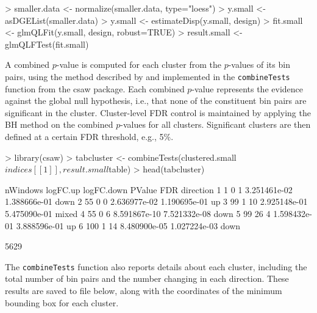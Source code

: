 \documentclass[12pt]{report}
\renewenvironment{Schunk}{\vspace{0pt}}{\vspace{0pt}}
\newcommand{\csaw}{csaw}
\newcommand{\code}[1]{{\small\texttt{#1}}}
\begin{document}
\begin{Schunk}
\begin{Sinput}
> smaller.data <- normalize(smaller.data, type="loess")
> y.small <- asDGEList(smaller.data)
> y.small <- estimateDisp(y.small, design)
> fit.small <- glmQLFit(y.small, design, robust=TRUE)
> result.small <- glmQLFTest(fit.small)
\end{Sinput}
\end{Schunk}

A combined $p$-value is computed for each cluster from the $p$-values of its bin pairs, using the method described by \cite{simes1986} and implemented in the \code{combineTests} function from the \csaw{} package.
Each combined $p$-value represents the evidence against the global null hypothesis, i.e., that none of the constituent bin pairs are significant in the cluster.
Cluster-level FDR control is maintained by applying the BH method on the combined $p$-values for all clusters.
Significant clusters are then defined at a certain FDR threshold, e.g., 5\%.

\begin{Schunk}
\begin{Sinput}
> library(csaw)
> tabcluster <- combineTests(clustered.small$indices[[1]], result.small$table)
> head(tabcluster)
\end{Sinput}
\begin{Soutput}
  nWindows logFC.up logFC.down       PValue          FDR direction
1        1        0          1 3.251461e-02 1.388666e-01      down
2       55        0          0 2.636977e-02 1.190695e-01        up
3       99        1         10 2.925148e-01 5.475090e-01     mixed
4       55        0          6 8.591867e-10 7.521332e-08      down
5       99       26          4 1.598432e-01 3.888596e-01        up
6      100        1         14 8.480900e-05 1.027224e-03      down
\end{Soutput}
\begin{Soutput}
[1] 5629
\end{Soutput}
\end{Schunk}

The \code{combineTests} function also reports details about each cluster, including the total number of bin pairs and the number changing in each direction.
These results are saved to file below, along with the coordinates of the minimum bounding box for each cluster.
\end{document}

